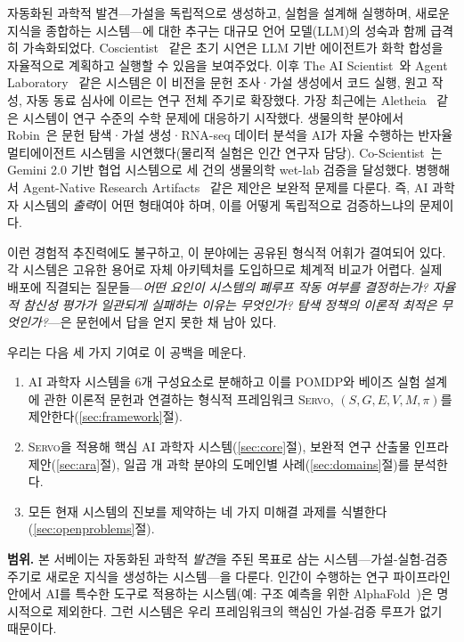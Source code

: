 \documentclass[11pt]{article}
\newcommand{\sgmvpi}{$(S, G, E, V, M, \pi)$}
\newcommand{\framework}{\textsc{Servo}}
\begin{document}
자동화된 과학적 발견---가설을 독립적으로 생성하고, 실험을 설계해 실행하며, 새로운 지식을 종합하는 시스템---에 대한 추구는 대규모 언어 모델(LLM)의 성숙과 함께 급격히 가속화되었다. Coscientist~\citep{boiko2023emergent} 같은 초기 시연은 LLM 기반 에이전트가 화학 합성을 자율적으로 계획하고 실행할 수 있음을 보여주었다. 이후 The AI Scientist~\citep{lu2024aiscientist}와 Agent Laboratory~\citep{schmidgall2025agentlab} 같은 시스템은 이 비전을 문헌 조사·가설 생성에서 코드 실행, 원고 작성, 자동 동료 심사에 이르는 연구 전체 주기로 확장했다. 가장 최근에는 Aletheia~\citep{google2026aletheia} 같은 시스템이 연구 수준의 수학 문제에 대응하기 시작했다. 생물의학 분야에서 Robin~\citep{ghareeb2026robin}은 문헌 탐색·가설 생성·RNA-seq 데이터 분석을 AI가 자율 수행하는 반자율 멀티에이전트 시스템을 시연했다(물리적 실험은 인간 연구자 담당). Co-Scientist~\citep{gottweis2026coscientist}는 Gemini 2.0 기반 협업 시스템으로 세 건의 생물의학 wet-lab 검증을 달성했다. 병행해서 Agent-Native Research Artifacts~\citep{liu2026lasthuman} 같은 제안은 보완적 문제를 다룬다. 즉, AI 과학자 시스템의 \emph{출력}이 어떤 형태여야 하며, 이를 어떻게 독립적으로 검증하느냐의 문제이다.

이런 경험적 추진력에도 불구하고, 이 분야에는 공유된 형식적 어휘가 결여되어 있다. 각 시스템은 고유한 용어로 자체 아키텍처를 도입하므로 체계적 비교가 어렵다. 실제 배포에 직결되는 질문들---\textit{어떤 요인이 시스템의 폐루프 작동 여부를 결정하는가? 자율적 참신성 평가가 일관되게 실패하는 이유는 무엇인가? 탐색 정책의 이론적 최적은 무엇인가?}---은 문헌에서 답을 얻지 못한 채 남아 있다.

우리는 다음 세 가지 기여로 이 공백을 메운다.

\begin{enumerate}
  \item AI 과학자 시스템을 6개 구성요소로 분해하고 이를 POMDP와 베이즈 실험 설계에 관한 이론적 문헌과 연결하는 형식적 프레임워크 \framework{}, \sgmvpi{}를 제안한다(\ref{sec:framework}절).
  \item \framework{}을 적용해 핵심 AI 과학자 시스템(\ref{sec:core}절), 보완적 연구 산출물 인프라 제안(\ref{sec:ara}절), 일곱 개 과학 분야의 도메인별 사례(\ref{sec:domains}절)를 분석한다.
  \item 모든 현재 시스템의 진보를 제약하는 네 가지 미해결 과제를 식별한다(\ref{sec:openproblems}절).
\end{enumerate}

\noindent\textbf{범위.} 본 서베이는 자동화된 과학적 \emph{발견}을 주된 목표로 삼는 시스템---가설-실험-검증 주기로 새로운 지식을 생성하는 시스템---을 다룬다. 인간이 수행하는 연구 파이프라인 안에서 AI를 특수한 도구로 적용하는 시스템(예: 구조 예측을 위한 AlphaFold~\citep{jumper2021alphafold})은 명시적으로 제외한다. 그런 시스템은 우리 프레임워크의 핵심인 가설-검증 루프가 없기 때문이다.
\end{document}

